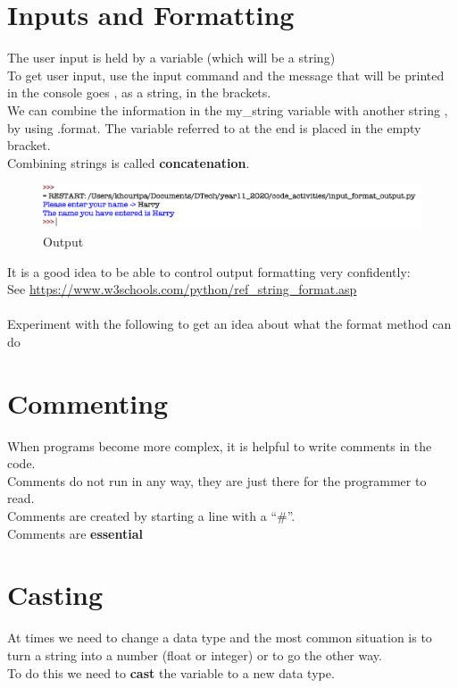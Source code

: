 \documentclass[a4paper,12pt]{article}
\begin{document}
\newpage
\section{Inputs and Formatting}
The user input is held by a variable (which will be a string)\\
To get user input, use the input command and the message that will be printed in the console goes , as a string, in the brackets.\\
We can combine the information in the my\_string variable with another string , by using .format.
The variable referred to at the end is placed in the empty bracket.\\
Combining strings is called \textbf{concatenation}.



\begin{figure} [!h]
	\centering
	\includegraphics[width=18cm]{screen_shots/input_format_output.png}
	\caption*{Output}
\end{figure}

It is a good idea to be able to control output formatting very confidently:\\
See \url{https://www.w3schools.com/python/ref_string_format.asp}\\\\
Experiment with the following to get an idea about what the format method can do

\newpage
\section{Commenting}
When programs become more complex, it is helpful to write comments in the code.\\
Comments do not run in any way, they are just there for the programmer to read.\\
Comments are created by starting a line with a ``\#''.\\
Comments are \textbf{essential}

\newpage
\section{Casting}
At times we need to change a data type and the most common situation is to turn a string into a number (float or integer) or to go the other way.\\
To do this we need to \textbf{cast} the variable to a new data type.

\end{document}
